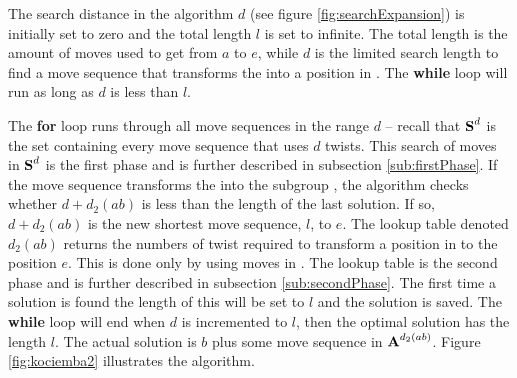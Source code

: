 The search distance in the algorithm $d$ (see figure \ref{fig:searchExpansion}) is initially set to zero and the total length $l$ is set to infinite. The total length is the amount of moves used to get from $a$ to $e$, while $d$ is the limited search length to find a move sequence that transforms the \rubik{} into a position in . 
The \textbf{while} loop will run as long as $d$ is less than $l$.

The \textbf{for} loop runs through all move sequences in the range $d$ -- recall that $\textbf{S}^d$ is the set containing every move sequence that uses $d$ twists. This search of moves in $\textbf{S}^d$ is the first phase and is further described in subsection \ref{sub:firstPhase}.
 If the move sequence transforms the \cube{} into the subgroup , the algorithm checks whether $d + d_2(ab)$ is less than the length of the last solution. 
 If so, $d + d_2(ab)$ is the new shortest move sequence, $l$, to $e$. 
The lookup table denoted $d_2(ab)$ returns the numbers of twist required to transform a position in  to the position $e$. This is done only by using moves in . %
The lookup table is the second phase and is further described in subsection \ref{sub:secondPhase}. 
The first time a solution is found the length of this will be set to $l$ and the solution is saved. The \textbf{while} loop will end when $d$ is incremented to $l$, then the optimal solution has the length $l$. The actual solution is $b$ plus some move sequence in $\textbf{A}^{d_{2}(ab)}$. Figure \ref{fig:kociemba2} illustrates the algorithm.
